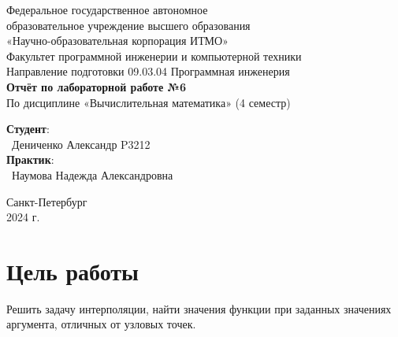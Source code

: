 \documentclass{article}
\begin{document}
\begin{center}
    \Large
    Федеральное государственное автономное \\
    образовательное учреждение высшего образования \\ 
    «Научно-образовательная корпорация ИТМО»\\
    \vspace{0.5cm}
    \large
    Факультет программной инженерии и компьютерной техники \\
    Направление подготовки 09.03.04 Программная инженерия \\
    \vspace{1cm}
    \Large
    \textbf{Отчёт по лабораторной работе №6} \\
    По дисциплине «Вычислительная математика» (4 семестр)\\
    \large
    \vspace{8cm}

    \begin{minipage}{.33\textwidth}
    \end{minipage}
    \hfill
    \begin{minipage}{.4\textwidth}
    
        \textbf{Студент}: \vspace{.1cm} \\
        \ Дениченко Александр P3212\\
        \textbf{Практик}:  \\
        \ Наумова Надежда Александровна
    \end{minipage}
    \vfill
Санкт-Петербург\\ 2024 г.
\end{center}
\pagestyle{empty}
\newpage
\pagestyle{plain}
\section{Цель работы}
Решить задачу интерполяции, найти значения функции при заданных значениях аргумента, отличных от узловых точек.
\end{document}
